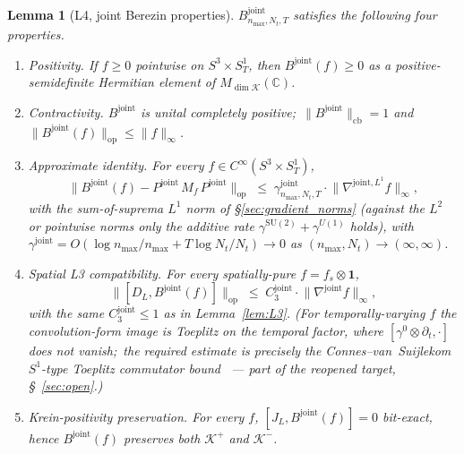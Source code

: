\documentclass[11pt,a4paper]{article}
\theoremstyle{plain}
\newtheorem{lemma}[theorem]{Lemma}
\theoremstyle{definition}
\newcommand{\nmax}{n_{\max}}
\newcommand{\Nt}{N_{t}}
\newcommand{\Sone}{S^{1}}
\newcommand{\Manifold}{S^{3}\times S^{1}_{T}}
\newcommand{\Krein}{\mathcal{K}}
\newcommand{\opnorm}[1]{\lVert #1 \rVert_{\mathrm{op}}}
\newcommand{\cbnorm}[1]{\lVert #1 \rVert_{\mathrm{cb}}}
\newcommand{\norm}[1]{\lVert #1 \rVert}
\newcommand{\C}{\mathbb{C}}
\newcommand{\SU}{\mathrm{SU}}
\newcommand{\Uone}{U(1)}
\newcommand{\Mat}{M}
\newcommand{\DL}{D_{L}}
\newcommand{\JL}{J_{L}}
\newcommand{\Bjoint}{B^{\mathrm{joint}}}
\newcommand{\Pjoint}{P^{\mathrm{joint}}}
\newcommand{\gammajoint}{\gamma^{\mathrm{joint}}}
\newcommand{\gammaSU}{\gamma^{\SU(2)}}
\newcommand{\gammaU}{\gamma^{\Uone}}
\newcommand{\Cthreejoint}{C_{3}^{\mathrm{joint}}}
\newcommand{\Kplus}{\Krein^{+}}
\newcommand{\Kminus}{\Krein^{-}}
\begin{document}
\begin{lemma}[L4, joint Berezin properties]\label{lem:L4}
$\Bjoint_{\nmax,\Nt,T}$ satisfies the following four properties.
\begin{enumerate}
\item[(a)] \emph{Positivity.} If $f \ge 0$ pointwise on
$\Manifold$, then $\Bjoint(f) \ge 0$ as a positive-semidefinite
Hermitian element of $\Mat_{\dim\Krein}(\C)$.
\item[(b)] \emph{Contractivity.} $\Bjoint$ is unital completely
positive;\ $\cbnorm{\Bjoint} = 1$ and $\opnorm{\Bjoint(f)} \le
\norm{f}_{\infty}$.
\item[(c)] \emph{Approximate identity.} For every $f \in C^{\infty}(\Manifold)$,
\begin{equation}\label{eq:L4_approx_id}
   \opnorm{\Bjoint(f) - \Pjoint\,M_{f}\,\Pjoint}
   \;\le\; \gammajoint_{\nmax,\Nt,T} \cdot
            \norm{\nabla^{\mathrm{joint}, L^{1}} f}_{\infty},
\end{equation}
with the sum-of-suprema $L^{1}$ norm of \S\ref{sec:gradient_norms} (against
the $L^{2}$ or pointwise norms only the additive rate
$\gammaSU + \gammaU$ holds),
with $\gammajoint = O(\log\nmax/\nmax + T\log\Nt/\Nt) \to 0$ as
$(\nmax, \Nt) \to (\infty, \infty)$.
\item[(d)] \emph{Spatial L3 compatibility.} For every spatially-pure
$f = f_{s} \otimes \mathbf{1}$,
\begin{equation}\label{eq:L4_L3compat}
   \opnorm{[\DL, \Bjoint(f)]}
   \;\le\; \Cthreejoint \cdot \norm{\nabla^{\mathrm{joint}} f}_{\infty},
\end{equation}
with the same $\Cthreejoint \le 1$ as in Lemma~\ref{lem:L3}.
\emph{(For temporally-varying $f$ the convolution-form image is
Toeplitz on the temporal factor, where
$[\gamma^{0} \otimes \partial_{t}, \cdot]$ does not vanish;\ the
required estimate is precisely the Connes--van~Suijlekom
$\Sone$-type Toeplitz commutator bound~\cite{connes_vs2021} — part of
the reopened target, \S~\ref{sec:open}.)}
\item[(e)] \emph{Krein-positivity preservation.} For every $f$,
$[\JL, \Bjoint(f)] = 0$ bit-exact, hence
$\Bjoint(f)$ preserves both $\Kplus$ and $\Kminus$.
\end{enumerate}
\end{lemma}
\end{document}
